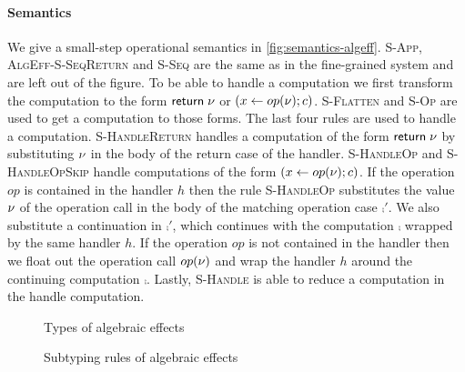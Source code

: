 {\paragraph{Semantics}
We give a small-step operational semantics in \cref{fig:semantics-algeff}.
\textsc{S-App}, \textsc{AlgEff-S-SeqReturn} and \textsc{S-Seq} are the same as in the fine-grained system and are left out of the figure.
To be able to handle a computation we first transform the computation to the form $\mathsf{return} \; \nu$ or $(x \leftarrow op(\nu) ; c)$.
\textsc{S-Flatten} and \textsc{S-Op} are used to get a computation to those forms.
The last four rules are used to handle a computation.
\textsc{S-HandleReturn} handles a computation of the form $\mathsf{return} \; \nu$ by substituting $\nu$ in the body of the return case of the handler.
\textsc{S-HandleOp} and \textsc{S-HandleOpSkip} handle computations of the form $(x \leftarrow op(\nu) ; c)$.
If the operation $op$ is contained in the handler $h$ then the rule \textsc{S-HandleOp} substitutes the value $\nu$ of the operation call in the body of the matching operation case $\comp'$.
We also substitute a continuation in $\comp'$, which continues with the computation $\comp$ wrapped by the same handler $h$.
If the operation $op$ is not contained in the handler then we float out the operation call $op(\nu)$ and wrap the handler $h$ around the continuing computation $\comp$.
Lastly, \textsc{S-Handle} is able to reduce a computation in the handle computation.

\begin{figure}
\caption{Types of algebraic effects}
\centering
{}
\end{figure}

\begin{figure}
\caption{Subtyping rules of algebraic effects}
\centering
{}
\end{figure}

}
